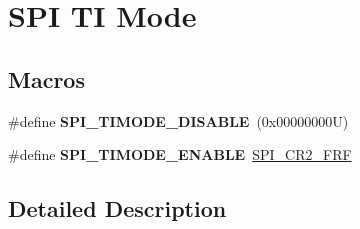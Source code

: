 \hypertarget{group___s_p_i___t_i__mode}{}\section{S\+PI TI Mode}
\label{group___s_p_i___t_i__mode}
\subsection*{Macros}
\begin{DoxyCompactItemize}
\item 
\mbox{\label{group___s_p_i___t_i__mode_gaffbf066ee656a4d56b75fa721a2eabcd}} 
\#define {\bfseries S\+P\+I\+\_\+\+T\+I\+M\+O\+D\+E\+\_\+\+D\+I\+S\+A\+B\+LE}~(0x00000000\+U)
\item 
\mbox{\label{group___s_p_i___t_i__mode_ga8b31d4b25f951edd1dfd7cf6d4387517}} 
\#define {\bfseries S\+P\+I\+\_\+\+T\+I\+M\+O\+D\+E\+\_\+\+E\+N\+A\+B\+LE}~\mbox{\hyperlink{group___peripheral___registers___bits___definition_ga09e3f41fa2150831afaac191046087f2}{S\+P\+I\+\_\+\+C\+R2\+\_\+\+F\+RF}}
\end{DoxyCompactItemize}


\subsection{Detailed Description}
